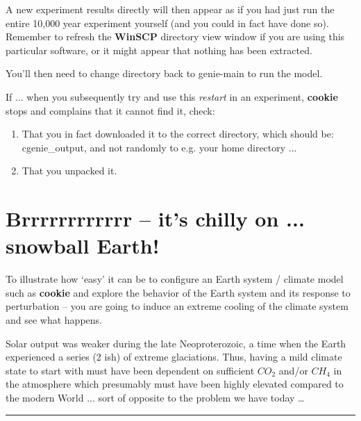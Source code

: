 A new experiment results directly will then appear as if you had just run the entire 10,000 year experiment yourself (and you could in fact have done so). Remember to refresh the \textbf{WinSCP} directory view window if you are using this particular software, or it might appear that nothing has been extracted.

\vspace{1mm}
You’ll then need to change directory back to \textsf{\footnotesize genie-main} to run the model.

\vspace{1mm}
If ... when you subsequently try and use this \textit{restart} in an experiment, \textbf{cookie} stops and complains that it cannot find it, check:
\begin{enumerate}[noitemsep]
\item That you in fact downloaded it to the correct directory, which should be: \textsf{\footnotesize cgenie\_output}, and not randomly to e.g. your home directory ...
\item That you unpacked it.
\end{enumerate}

\newpage

\section{Brrrrrrrrrrrr – it’s chilly on ... snowball Earth!}

To illustrate how ‘easy’ it can be to configure an Earth system / climate model such as \textbf{cookie} and explore the behavior of the Earth system and its response to perturbation – you are going to induce an extreme cooling of the climate system and see what happens. 

Solar output was weaker during the late Neoproterozoic, a time when the Earth experienced a series (2 ish) of extreme glaciations. Thus, having a mild climate state to start with must have been dependent on sufficient \(CO_{2}\) and/or \(CH_{4}\) in the atmosphere which presumably must have been highly elevated compared to the modern World ... sort of opposite to the problem we have today …

\vspace{1mm}
\noindent\rule{4cm}{0.5pt}
\vspace{2mm}


